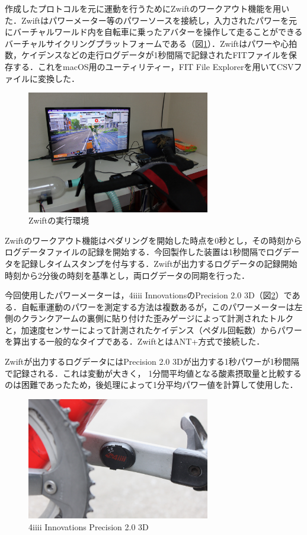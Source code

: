 作成したプロトコルを元に運動を行うためにZwiftのワークアウト機能を用いた．Zwiftはパワーメーター等のパワーソースを接続し，入力されたパワーを元にバーチャルワールド内を自転車に乗ったアバターを操作して走ることができるバーチャルサイクリングプラットフォームである（図\ref{fig:zwift}）．Zwiftはパワーや心拍数，ケイデンスなどの走行ログデータが1秒間隔で記録されたFITファイルを保存する．これをmacOS用のユーティリティー，FIT File Explorer\cite{fitfile}を用いてCSVファイルに変換した．

\begin{figure}[H]
  \begin{center}
    \includegraphics[width=8cm]{fig/zwift}
    \caption{Zwiftの実行環境}
    \label{fig:zwift}
  \end{center}
\end{figure}

Zwiftのワークアウト機能はペダリングを開始した時点を0秒とし，その時刻からログデータファイルの記録を開始する．今回製作した装置は1秒間隔でログデータを記録しタイムスタンプを付与する．Zwiftが出力するログデータの記録開始時刻から2分後の時刻を基準とし，両ログデータの同期を行った．

今回使用したパワーメーターは，4iiii InnovationsのPrecision 2.0 3D（図\ref{fig:4iiii}）である．自転車運動のパワーを測定する方法は複数あるが，このパワーメーターは左側のクランクアームの裏側に貼り付けた歪みゲージによって計測されたトルクと，加速度センサーによって計測されたケイデンス（ペダル回転数）からパワーを算出する一般的なタイプである．ZwiftとはANT+方式で接続した．

Zwiftが出力するログデータにはPrecision 2.0 3Dが出力する1秒パワーが1秒間隔で記録される．これは変動が大きく， 1分間平均値となる酸素摂取量と比較するのは困難であったため，後処理によって1分平均パワー値を計算して使用した．

\begin{figure}[H]
  \begin{center}
    \includegraphics[width=8cm]{fig/4iiii}
    \caption{4iiii Innovations Precision 2.0 3D}
    \label{fig:4iiii}
  \end{center}
\end{figure}

